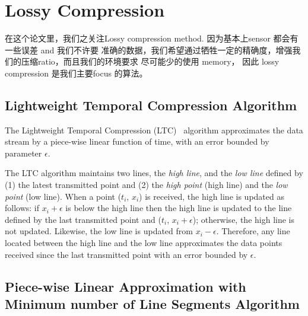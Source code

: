 \section{Lossy Compression}

在这个论文里，我们之关注Lossy compression method. 
因为基本上sensor 都会有一些误差 and 我们不许要 准确的数据，我们希望通过牺牲一定的精确度，增强我们的压缩ratio，而且我们的环境要求  尽可能少的使用 memory， 
因此 lossy compression 是我们主要focus 的算法。 

\subsection{Lightweight Temporal Compression Algorithm}
\label{sec:ltc}
The Lightweight Temporal Compression (LTC)~\cite{schoellhammer2004lightweight}
algorithm approximates the data stream by a piece-wise linear function of time,
with an error bounded by parameter $\epsilon$. 

The LTC algorithm maintains two lines, the \emph{high line}, and the \emph{low
line} defined by (1) the latest transmitted point and (2) the \emph{high point}
(high line) and the \emph{low point} (low line). When a point ($t_i$, $x_i$) is
received, the high line is updated as follows: if $x_i+\epsilon$ is below the
high line then the high line is updated to the line defined by the last
transmitted point and ($t_i$, $x_i+\epsilon$); otherwise, the high line is not
updated. Likewise, the low line is updated from $x_i-\epsilon$. Therefore, any
line located between the high line and the low line approximates the data points
received since the last transmitted point with an error bounded by $\epsilon$.


\subsection{Piece-wise Linear Approximation with Minimum number of Line Segments
Algorithm}



